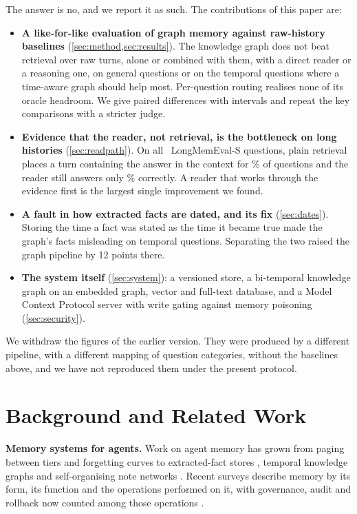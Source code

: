 \documentclass[11pt,letterpaper]{article}
\begin{document}
The answer is no, and we report it as such. The contributions of this paper are:

\begin{itemize}
\item \textbf{A like-for-like evaluation of graph memory against raw-history baselines} (\cref{sec:method,sec:results}). The knowledge graph does not beat retrieval over raw turns, alone or combined with them, with a direct reader or a reasoning one, on general questions or on the temporal questions where a time-aware graph should help most. Per-question routing realises none of its oracle headroom. We give paired differences with intervals and repeat the key comparisons with a stricter judge.
\item \textbf{Evidence that the reader, not retrieval, is the bottleneck on long histories} (\cref{sec:readpath}). On all \numFullLmeQuestions\ LongMemEval-S questions, plain retrieval places a turn containing the answer in the context for \numFullLmeEvidenceDense\% of questions and the reader still answers only \numFullLmeRawDenseJudged\% correctly. A reader that works through the evidence first is the largest single improvement we found.
\item \textbf{A fault in how extracted facts are dated, and its fix} (\cref{sec:dates}). Storing the time a fact was stated as the time it became true made the graph's facts misleading on temporal questions. Separating the two raised the graph pipeline by 12 points there.
\item \textbf{The system itself} (\cref{sec:system}): a versioned store, a bi-temporal knowledge graph on an embedded graph, vector and full-text database, and a Model Context Protocol server with write gating against memory poisoning (\cref{sec:security}).
\end{itemize}

We withdraw the figures of the earlier version. They were produced by a different pipeline, with a different mapping of question categories, without the baselines above, and we have not reproduced them under the present protocol.

\section{Background and Related Work}
\label{sec:background}

\textbf{Memory systems for agents.} Work on agent memory has grown from paging between tiers \citep{packer2023memgpt} and forgetting curves \citep{zhong2024memorybank} to extracted-fact stores \citep{chhikara2025mem0}, temporal knowledge graphs \citep{rasmussen2025zep} and self-organising note networks \citep{xu2025mem}. Recent surveys describe memory by its form, its function and the operations performed on it, with governance, audit and rollback now counted among those operations \citep{hu2025memoryage}.
\end{document}
